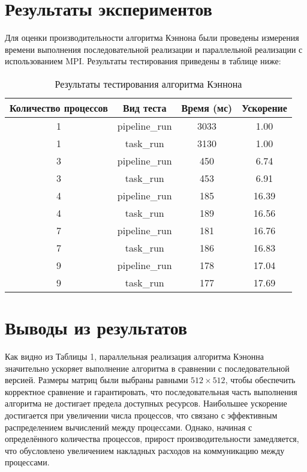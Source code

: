 \documentclass[12pt]{article}
\begin{document}
\section{Результаты экспериментов}

Для оценки производительности алгоритма Кэннона были проведены измерения времени выполнения последовательной реализации и параллельной реализации с использованием MPI. Результаты тестирования приведены в таблице ниже:
\begin{table}[htbp]
\centering
\caption{Результаты тестирования алгоритма Кэннона}
\begin{tabular}{|c|c|c|c|}
    \hline
    \textbf{Количество процессов} & \textbf{Вид теста} & \textbf{Время (мс)} & \textbf{Ускорение} \\ \hline
    1 & pipeline\_run & 3033 & 1.00 \\ \hline
    1 & task\_run     & 3130 & 1.00 \\ \hline
    3 & pipeline\_run & 450  & 6.74 \\ \hline
    3 & task\_run     & 453  & 6.91 \\ \hline
    4 & pipeline\_run & 185  & 16.39 \\ \hline
    4 & task\_run     & 189  & 16.56 \\ \hline
    7 & pipeline\_run & 181  & 16.76 \\ \hline
    7 & task\_run     & 186  & 16.83 \\ \hline
    9 & pipeline\_run & 178  & 17.04 \\ \hline
    9 & task\_run     & 177  & 17.69 \\ \hline
\end{tabular}
\label{tab:performance_results}
\end{table}

\section{Выводы из результатов}

\hspace*{1.25em}Как видно из Таблицы 1, параллельная реализация алгоритма Кэнонна значительно ускоряет выполнение алгоритма в сравнении с последовательной версией. Размеры матриц были выбраны равными $512 \times 512$, чтобы обеспечить корректное сравнение и гарантировать, что последовательная часть выполнения алгоритма не достигает предела доступных ресурсов. Наибольшее ускорение достигается при увеличении числа процессов, что связано с эффективным распределением вычислений между процессами. Однако, начиная с определённого количества процессов, прирост производительности замедляется, что обусловлено увеличением накладных расходов на коммуникацию между процессами.
\end{document}
